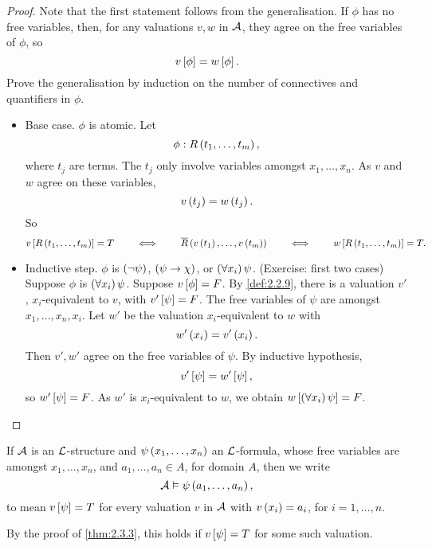 \begin{proof}
Note that the first statement follows from the generalisation. If $ \phi $ has no free variables, then, for any valuations $ v, w $ in $ \AA $, they agree on the free variables of $ \phi $, so
$$ v\sb{\phi} = w\sb{\phi}. $$
Prove the generalisation by induction on the number of connectives and quantifiers in $ \phi $.
\begin{itemize}
\item Base case. $ \phi $ is atomic. Let
$$ \phi : R\rb{t_1, \dots, t_m}, $$
where $ t_j $ are terms. The $ t_j $ only involve variables amongst $ x_1, \dots, x_n $. As $ v $ and $ w $ agree on these variables,
$$ v\rb{t_j} = w\rb{t_j}. $$
So
$$ v\sb{R\rb{t_1, \dots, t_m}} = T \qquad \iff \qquad \overline{R}\rb{v\rb{t_1}, \dots, v\rb{t_m}} \qquad \iff \qquad w\sb{R\rb{t_1, \dots, t_m}} = T. $$
\item Inductive step. $ \phi $ is $ \notb{\psi} $, $ \impb{\psi}{\chi} $, or $ \fab{x_i}\psi $. (Exercise: first two cases) Suppose $ \phi $ is $ \fab{x_i}\psi $. Suppose $ v\sb{\phi} = F $. By \ref{def:2.2.9}, there is a valuation $ v' $, $ x_i $-equivalent to $ v $, with $ v'\sb{\psi} = F $. The free variables of $ \psi $ are amongst $ x_1, \dots, x_n, x_i $. Let $ w' $ be the valuation $ x_i $-equivalent to $ w $ with
$$ w'\rb{x_i} = v'\rb{x_i}. $$
Then $ v', w' $ agree on the free variables of $ \psi $. By inductive hypothesis,
$$ v'\sb{\psi} = w'\sb{\psi}, $$
so $ w'\sb{\psi} = F $. As $ w' $ is $ x_i $-equivalent to $ w $, we obtain $ w\sb{\fab{x_i}\psi} = F $.
\end{itemize}
\end{proof}


\begin{remark}
If $ \AA $ is an $ \LL $-structure and $ \psi\rb{x_1, \dots, x_n} $ an $ \LL $-formula, whose free variables are amongst $ x_1, \dots, x_n $, and $ a_1, \dots, a_n \in A $, for domain $ A $, then we write
$$ \AA \vDash \psi\rb{a_1, \dots, a_n}, $$
to mean $ v\sb{\psi} = T $ for every valuation $ v $ in $ \AA $ with $ v\rb{x_i} = a_i $, for $ i = 1, \dots, n $.
\end{remark}

\begin{remark*}
By the proof of \ref{thm:2.3.3}, this holds if $ v\sb{\psi} = T $ for some such valuation.
\end{remark*}

